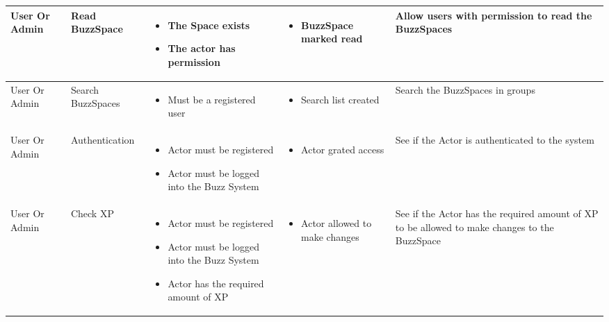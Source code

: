 \begin{longtable}{@{}|p{1.5cm}|p{2.2cm}|p{3cm}|p{3.5cm}|p{3.5cm}|@{}}
		User Or Admin& 
		Read BuzzSpace& 
		\begin{itemize}
			\item The Space exists
			\item The actor has permission
		\end{itemize}& 
		\begin{itemize}
			\item BuzzSpace marked read
		\end{itemize} & 
		Allow users with permission to read the BuzzSpaces \\ \midrule
		
		User Or Admin& 
		Search BuzzSpaces& 
		\begin{itemize}
			\item Must be a registered user
		\end{itemize}& 
		\begin{itemize}
			\item Search list created
		\end{itemize} & 
		Search the BuzzSpaces in groups \\ \midrule
		
		User Or Admin& 
		Authentication& 
		\begin{itemize}
			\item Actor must be registered
			\item Actor must be logged into the Buzz System 
		\end{itemize}& 
		\begin{itemize}
			\item Actor grated access
		\end{itemize} & 
		See if the Actor is authenticated to the system \\ \midrule
		
		User Or Admin& 
		Check XP& 
		\begin{itemize}
			\item Actor must be registered
			\item Actor must be logged into the Buzz System 
			\item Actor has the required amount of XP
		\end{itemize}& 
		\begin{itemize}
			\item Actor allowed to make changes
		\end{itemize} & 
		See if the Actor has the required amount of XP to be allowed to make changes to the BuzzSpace \\ \bottomrule
		
	\end{longtable}
